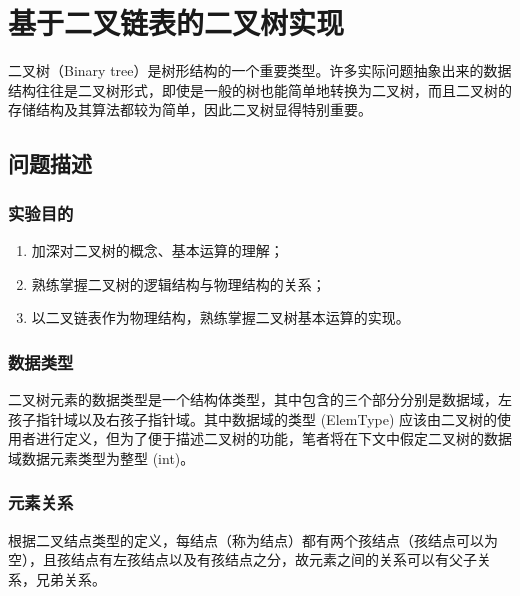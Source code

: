 \documentclass[supercite]{Experimental_Report}
\theoremstyle{definition}
\begin{document}
\section{基于二叉链表的二叉树实现}
二叉树（Binary tree）是树形结构的一个重要类型。许多实际问题抽象出来的数据结构往往是二叉树形式，即使是一般的树也能简单地转换为二叉树，而且二叉树的存储结构及其算法都较为简单，因此二叉树显得特别重要。
\subsection{问题描述}

\subsubsection{实验目的}
\begin{enumerate}
	\item 加深对二叉树的概念、基本运算的理解；
	\item 熟练掌握二叉树的逻辑结构与物理结构的关系；
	\item 以二叉链表作为物理结构，熟练掌握二叉树基本运算的实现。
\end{enumerate}

\subsubsection{数据类型}
二叉树元素的数据类型是一个结构体类型，其中包含的三个部分分别是数据域，左孩子指针域以及右孩子指针域。其中数据域的类型 (ElemType) 应该由二叉树的使用者进行定义，但为了便于描述二叉树的功能，笔者将在下文中假定二叉树的数据域数据元素类型为整型 (int)。

\subsubsection{元素关系}
根据二叉结点类型的定义，每结点（称为结点）都有两个孩结点（孩结点可以为空），且孩结点有左孩结点以及有孩结点之分，故元素之间的关系可以有父子关系，兄弟关系。
\end{document}
